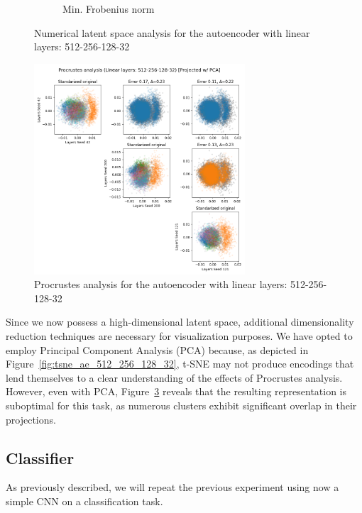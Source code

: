 \documentclass[../main.tex]{subfiles}
\begin{document}
\begin{figure}[ht!]
\begin{subfigure}[b]{0.45\textwidth}
        \caption{Min. Frobenius norm}
         \label{fig:frob_ae_512_256_128_32}
     \end{subfigure}
    \caption{Numerical latent space analysis for the autoencoder with linear layers: 512-256-128-32}
    \label{fig:lat_num_ae_512_256_128_32}
\end{figure}


\begin{figure}[ht!]
    \centering
    \includegraphics[width=0.7\textwidth]{figures/rs/sim_ae/procrustes_512-256-128-32__42_200_121.png} 
    \caption{Procrustes analysis for the autoencoder with linear layers: 512-256-128-32}
    \label{fig:proc_ae_512_256_128_32}
\end{figure}

Since we now possess a high-dimensional latent space, additional dimensionality reduction techniques are necessary for visualization purposes. We have opted to employ Principal Component Analysis (PCA) because, as depicted in Figure~\ref{fig:tsne_ae_512_256_128_32}, t-SNE may not produce encodings that lend themselves to a clear understanding of the effects of Procrustes analysis. However, even with PCA, Figure~\ref{fig:proc_ae_512_256_128_32} reveals that the resulting representation is suboptimal for this task, as numerous clusters exhibit significant overlap in their projections.


\subsection{Classifier}
As previously described, we will repeat the previous experiment using now a simple CNN on a classification task.\\
\end{document}
